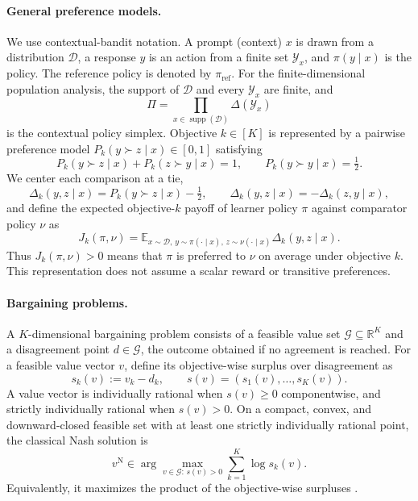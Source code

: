 \documentclass{article}
\theoremstyle{remark}
\theoremstyle{plain}
\newcommand{\Y}{\mathcal{Y}}
\newcommand{\G}{\mathcal{G}}
\newcommand{\E}{\mathbb{E}}
\newcommand{\R}{\mathbb{R}}
\newcommand{\D}{\mathcal{D}}
\newcommand{\piref}{\pi_{\mathrm{ref}}}
\begin{document}
\paragraph{General preference models.}
We use contextual-bandit notation. A prompt (context) $x$ is drawn from a distribution $\D$, a response $y$ is an action from a finite set $\Y_x$, and $\pi(y\mid x)$ is the policy. The reference policy is denoted by $\piref$. For the finite-dimensional population analysis, the support of $\D$ and every $\Y_x$ are finite, and
\[
\Pi=\prod_{x\in\operatorname{supp}(\D)}\Delta(\Y_x)
\]
is the contextual policy simplex. Objective $k\in[K]$ is represented by a pairwise preference model $P_k(y\succ z\mid x)\in[0,1]$ satisfying
\begin{equation}
P_k(y\succ z\mid x)+P_k(z\succ y\mid x)=1,
\qquad
P_k(y\succ y\mid x)=\tfrac12.
\label{eq:skew}
\end{equation}
We center each comparison at a tie,
\begin{equation}
\Delta_k(y,z\mid x)
=
P_k(y\succ z\mid x)-\tfrac12,
\qquad
\Delta_k(y,z\mid x)=-\Delta_k(z,y\mid x),
\label{eq:centered}
\end{equation}
and define the expected objective-$k$ payoff of learner policy $\pi$ against comparator policy $\nu$ as
\begin{equation}
J_k(\pi,\nu)
=
\E_{x\sim\D,\,y\sim\pi(\cdot\mid x),\,z\sim\nu(\cdot\mid x)}
\Delta_k(y,z\mid x).
\label{eq:game-payoff}
\end{equation}
Thus $J_k(\pi,\nu)>0$ means that $\pi$ is preferred to $\nu$ on average under objective $k$. This representation does not assume a scalar reward or transitive preferences.

\paragraph{Bargaining problems.}
A $K$-dimensional bargaining problem consists of a feasible value set $\G\subseteq\R^K$ and a disagreement point $d\in\G$, the outcome obtained if no agreement is reached. For a feasible value vector $v$, define its objective-wise surplus over disagreement as
\begin{equation}
s_k(v):=v_k-d_k,
\qquad
s(v)=(s_1(v),\ldots,s_K(v)).
\label{eq:classical-surplus}
\end{equation}
A value vector is individually rational when $s(v)\ge0$ componentwise, and strictly individually rational when $s(v)>0$. On a compact, convex, and downward-closed feasible set with at least one strictly individually rational point, the classical Nash solution is
\begin{equation}
v^{\mathrm N}
\in
\arg\max_{v\in\G:\,s(v)>0}
\sum_{k=1}^K\log s_k(v).
\label{eq:classical-nash}
\end{equation}
Equivalently, it maximizes the product of the objective-wise surpluses \citep{nash1950}.
\end{document}
